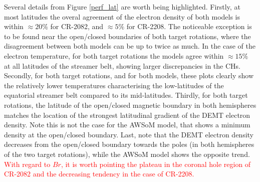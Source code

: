 \documentclass[namedreferences]{solarphysics}
\def\diego#1{\textcolor{red}{#1}}
\begin{document}
\begin{article}
{{Several details from Figure \ref{perf_lat} are worth being highlighted. Firstly, at most latitudes the overal agreement of the electron density of both models is within $\approx 20\%$ for CR-2082, and $\approx 5\%$ for CR-2208. The noticeable exception is to be found near the open/closed boundaries of both target rotations, where the disagreement between both models can be up to twice as much. In the case of the electron temperature, for both target rotations the models agree within $\approx 15\%$ at all latitudes of the streamer belt, showing larger discrepancies in the CHs.} Secondly, for both target rotations, and for both models, these plots clearly show the relatively lower temperatures characterising the low-latitudes of the equatorial streamer belt compared to its mid-latitudes. Thirdly, for both target rotations, the latitude of the open/closed magnetic boundary in both hemispheres matches the location of the strongest latitudinal gradient of the DEMT electron density. Note this is not the case for the AWSoM model, that shows a minimum density at the open/closed boundary. Last, note that the DEMT electron density decreases from the open/closed boundary towards the poles (in both hemispheres of the two target rotations), while the AWSoM model shows the opposite trend.} \diego{With regard to $Br$, it is worth pointing the plateau in the coronal hole region of CR-2082 and the decreasing tendency in the case of CR-2208.}


\end{article}
\end{document}
